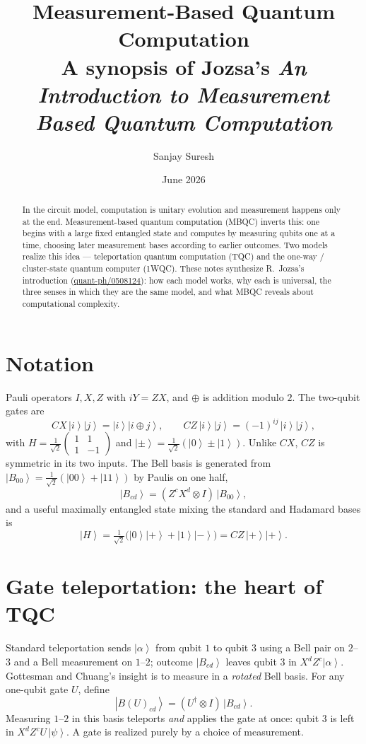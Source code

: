 \documentclass[11pt]{article}
\title{\textbf{Measurement-Based Quantum Computation}\\[0.3em]
  \large A synopsis of Jozsa's \emph{An Introduction to Measurement Based Quantum Computation}}
\author{Sanjay Suresh}
\date{June 2026}
\newcommand{\ket}[1]{\left|#1\right\rangle}
\theoremstyle{plain}
\begin{document}
\maketitle

\begin{abstract}
\noindent In the circuit model, computation is unitary evolution and measurement happens
only at the end. Measurement-based quantum computation (MBQC) inverts this: one begins with
a large fixed entangled state and computes by measuring qubits one at a time, choosing later
measurement bases according to earlier outcomes. Two models realize this idea --- teleportation
quantum computation (TQC) and the one-way / cluster-state quantum computer (1WQC). These notes
synthesize R.\ Jozsa's introduction (\href{https://arxiv.org/abs/quant-ph/0508124}{quant-ph/0508124}):
how each model works, why each is universal, the three senses in which they are the same model,
and what MBQC reveals about computational complexity.
\end{abstract}

\section{Notation}
Pauli operators $I, X, Z$ with $iY = ZX$, and $\oplus$ is addition modulo $2$. The two-qubit
gates are
\[ CX\,\ket{i}\ket{j} = \ket{i}\ket{i\oplus j}, \qquad CZ\,\ket{i}\ket{j} = (-1)^{ij}\,\ket{i}\ket{j}, \]
with $H=\tfrac{1}{\sqrt2}\left(\begin{smallmatrix}1&1\\1&-1\end{smallmatrix}\right)$ and
$\ket{\pm}=\tfrac{1}{\sqrt2}(\ket{0}\pm\ket{1})$. Unlike $CX$, $CZ$ is symmetric in its two inputs.
The Bell basis is generated from $\ket{B_{00}}=\tfrac{1}{\sqrt2}(\ket{00}+\ket{11})$ by Paulis on one half,
\[ \ket{B_{cd}} = (Z^c X^d \otimes I)\,\ket{B_{00}}, \]
and a useful maximally entangled state mixing the standard and Hadamard bases is
\[ \ket{H} = \tfrac{1}{\sqrt2}\big(\ket{0}\ket{+} + \ket{1}\ket{-}\big) = CZ\,\ket{+}\ket{+}. \]

\section{Gate teleportation: the heart of TQC}
Standard teleportation sends $\ket{\alpha}$ from qubit $1$ to qubit $3$ using a Bell pair on
$2$--$3$ and a Bell measurement on $1$--$2$; outcome $\ket{B_{cd}}$ leaves qubit $3$ in
$X^d Z^c\ket{\alpha}$. Gottesman and Chuang's insight is to measure in a \emph{rotated} Bell basis.
For any one-qubit gate $U$, define
\[ \ket{B(U)_{cd}} = (U^\dagger \otimes I)\,\ket{B_{cd}}. \]
Measuring $1$--$2$ in this basis teleports \emph{and} applies the gate at once: qubit $3$ is left
in $X^d Z^c U\,\ket{\psi}$. A gate is realized purely by a choice of measurement.
\end{document}
